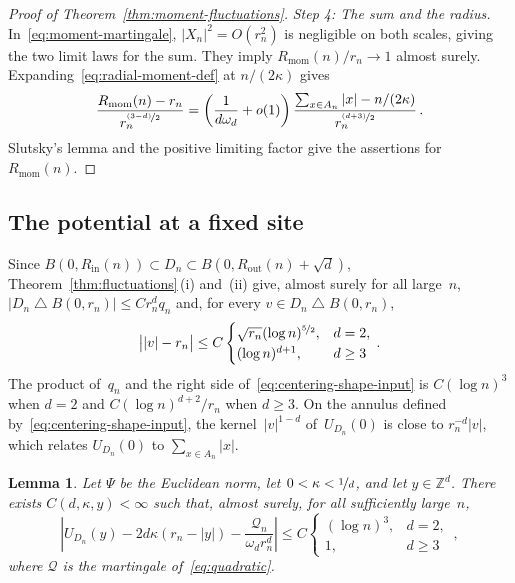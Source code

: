 \documentclass[11pt]{amsart}
\theoremstyle{plain}
\newtheorem{lemma}[theorem]{Lemma}
\theoremstyle{definition}
\newcommand{\Z}{\mathbb Z}
\newcommand{\drift}{\kappa}
\newcommand{\gauge}{\Psi}
\newcommand{\nf}{\nicefrac}
\newcommand{\Rin}{R_{\mathrm{in}}}
\newcommand{\Rout}{R_{\mathrm{out}}}
\newcommand{\Rmom}{R_{\mathrm{mom}}}
\numberwithin{equation}{section}
\begin{document}
\begin{proof}[Proof of Theorem~\ref{thm:moment-fluctuations}]
\emph{Step 4: The sum and the radius.} In~\eqref{eq:moment-martingale}, $|X_n|^2=O(r_n^2)$ is negligible on both scales, giving the two limit laws for the sum. They imply $\Rmom(n)/r_n\to1$ almost surely. Expanding~\eqref{eq:radial-moment-def} at $n/(2\drift)$ gives
\begin{equation*}
\frac{\Rmom(n)-r_n}{r_n^{\nf{(3-d)}{2}}}
=\left(\frac1{d\omega_d}+o(1)\right)
\frac{\sum_{x\in A_n}|x|-n/(2\drift)}{r_n^{\nf{(d+3)}{2}}}\, .
\end{equation*}
Slutsky's lemma and the positive limiting factor give the assertions for~$\Rmom(n)$.
\end{proof}

\subsection{The potential at a fixed site}

Since $B(0,\Rin(n))\subset D_n\subset B(0,\Rout(n)+\sqrt d)$, Theorem~\ref{thm:fluctuations}\,(i) and~(ii) give, almost surely for all large~$n$, $|D_n\mathbin{\triangle}B(0,r_n)|\leq Cr_n^dq_n$ and, for every $v\in D_n\mathbin{\triangle}B(0,r_n)$,
\begin{equation}\label{eq:centering-shape-input}
\bigl||v|-r_n\bigr|\leq C\begin{cases}\sqrt{r_n}(\log n)^{\nf52},&d=2,\\(\log n)^{d+1},&d\geq3\end{cases}\, .
\end{equation}
The product of~$q_n$ and the right side of~\eqref{eq:centering-shape-input} is $C(\log n)^3$ when $d=2$ and $C(\log n)^{d+2}/r_n$ when $d\geq3$. On the annulus defined by~\eqref{eq:centering-shape-input}, the kernel~$|v|^{1-d}$ of~$U_{D_n}(0)$ is close to $r_n^{-d}|v|$, which relates $U_{D_n}(0)$ to $\sum_{x\in A_n}|x|$.

\begin{lemma}\label{lem:fixed-site-centering}
Let $\gauge$ be the Euclidean norm, let $0<\drift<\nf1d$, and let $y\in\Z^d$. There exists $C(d,\drift,y)<\infty$ such that, almost surely, for all sufficiently large~$n$,
\begin{equation}\label{eq:fixed-site-centering}
\left|U_{D_n}(y)-2d\drift(r_n-|y|)-\frac{\mathcal Q_n}{\omega_dr_n^d}\right|\leq C\begin{cases}(\log n)^3,&d=2,\\1,&d\geq3\end{cases}\, ,
\end{equation}
where $\mathcal Q$ is the martingale of~\eqref{eq:quadratic}.
\end{lemma}
\end{document}
